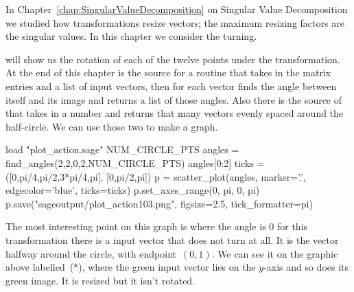 In Chapter~\ref{chap:SingularValueDecomposition} on 
Singular Value Decomposition we studied how
transformations resize vectors; the maximum resizing factors
are the singular values.
In this chapter we consider the turning.

\Sage{} will show us the rotation of each of the twelve points 
under the transformation.
At the end of this chapter is the source for a routine 
that takes in the matrix entries and a list of input vectors, then
for each vector finds the angle between itself and its image and
returns a list of those angles.
Also there is the source of  that takes in a
number and returns that many vectors evenly spaced around the half-circle. 
We can use those two to make a graph.
\begin{sageoutput}[d,0,1]
load "plot_action.sage"  
NUM_CIRCLE_PTS
angles = find_angles(2,2,0,2,NUM_CIRCLE_PTS)
angles[0:2]
ticks = ([0,pi/4,pi/2,3*pi/4,pi], [0,pi/2,pi])
p = scatter_plot(angles, marker='.', edgecolor='blue', ticks=ticks)
p.set_axes_range(0, pi, 0, pi) 
p.save("sageoutput/plot_action103.png", figsize=2.5, tick_formatter=pi)
\end{sageoutput}
\begin{center}
\end{center}
The most interesting point on this graph is where the angle is $0$\Dash
for this transformation there is a input vector that does not turn at all.
It is the vector halfway around the circle, with endpoint~$(0,1)$. 
We can see it on the graphic above labelled~($*$), where the green input
vector lies on the $y$-axis and so does its green image.
It is resized but it isn't rotated.

